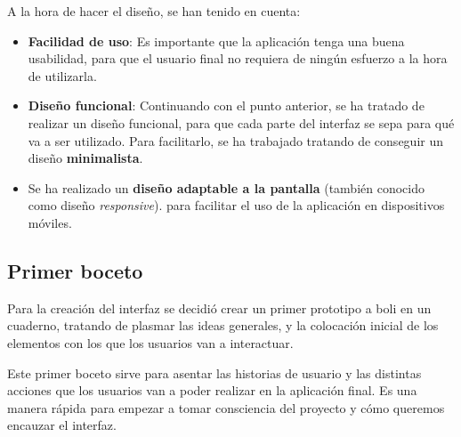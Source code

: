 \documentclass{\ClassPath/viu-tfm-template}
\begin{document}
A la hora de hacer el diseño, se han tenido en cuenta:
\vspace{-10pt}
\begin{itemize}
    \item \textbf{Facilidad de uso}: Es importante que la aplicación tenga una buena usabilidad, para que el usuario final no requiera de ningún esfuerzo a la hora de utilizarla.
    \item \textbf{Diseño funcional}: Continuando con el punto anterior, se ha tratado de realizar un diseño funcional, para que cada parte del interfaz se sepa para qué va a ser utilizado. Para facilitarlo, se ha trabajado tratando de conseguir un diseño \textbf{minimalista}.
    \item Se ha realizado un \textbf{diseño adaptable a la pantalla} (también conocido como diseño \textit{responsive}). para facilitar el uso de la aplicación en dispositivos móviles.
\end{itemize}


\subsection{Primer boceto}
Para la creación del interfaz se decidió crear un primer prototipo a boli en un cuaderno, tratando de plasmar las ideas generales, y la colocación inicial de los elementos con los que los usuarios van a interactuar.

Este primer boceto sirve para asentar las historias de usuario y las distintas acciones que los usuarios van a poder realizar en la aplicación final. Es una manera rápida para empezar a tomar consciencia del proyecto y cómo queremos encauzar el interfaz.
\end{document}
